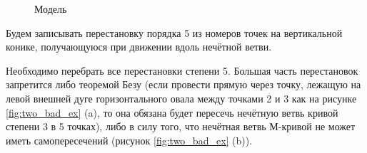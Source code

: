 \documentclass[14pt]{article}
\begin{document}
\begin{figure}[H]
\caption{Модель}
\label{fig:model_1-5}
\end{figure}

Будем записывать перестановку порядка 5 из номеров точек на вертикальной конике, получающуюся при движении вдоль нечётной ветви.  

Необходимо перебрать все перестановки степени 5. Большая часть перестановок запретится либо теоремой Безу (если провести прямую через точку, лежащую на левой внешней дуге горизонтального овала между точками 2 и 3 как на рисунке \ref{fig:two_bad_ex} (a), то она обязана будет пересечь нечётную ветвь кривой степени 3 в 5 точках), либо в силу того, что нечётная ветвь М-кривой не может иметь самопересечений (рисунок \ref{fig:two_bad_ex} (b)).
\end{document}
